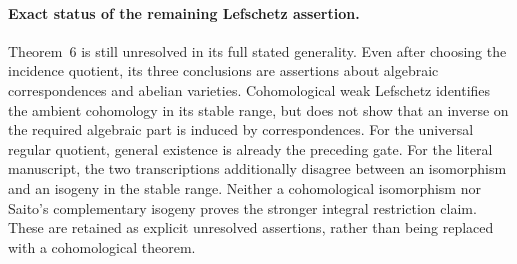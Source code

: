 \paragraph{Exact status of the remaining Lefschetz assertion.}
Theorem~6 is still unresolved in its full stated generality.
Even after choosing the incidence quotient, its three conclusions
are assertions about algebraic correspondences and abelian
varieties. Cohomological weak Lefschetz identifies the ambient
cohomology in its stable range, but does not show that an inverse
on the required algebraic part is induced by correspondences.
For the universal regular quotient, general existence is already
the preceding gate. For the literal manuscript, the two
transcriptions additionally disagree between an isomorphism and
an isogeny in the stable range. Neither a cohomological
isomorphism nor Saito's complementary isogeny proves the stronger
integral restriction claim. These are retained as explicit
unresolved assertions, rather than being replaced with a
cohomological theorem.
